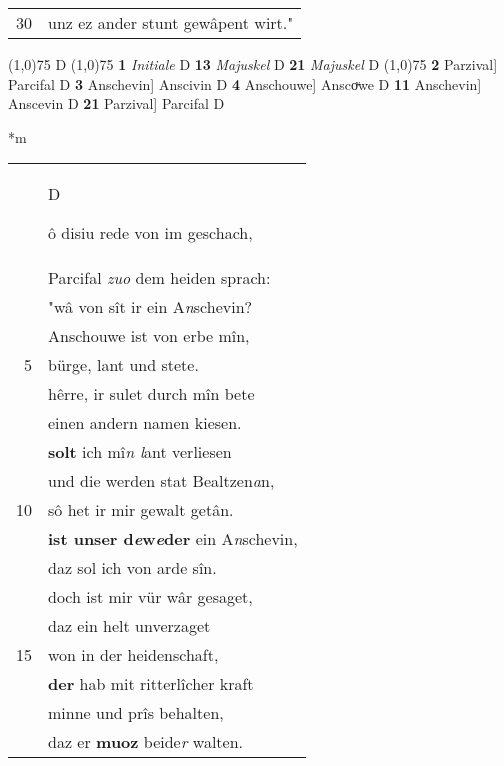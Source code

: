 \documentclass[8pt,a4paper,notitlepage]{article}
\begin{document}
\begin{table}[ht]
\begin{minipage}[t]{0.5\linewidth}
\begin{tabular}{rl}
30 & unz ez ander stunt gewâpent wirt."\\ 
\end{tabular}
\scriptsize
\line(1,0){75} \newline
D \newline
\line(1,0){75} \newline
\textbf{1} \textit{Initiale} D  \textbf{13} \textit{Majuskel} D  \textbf{21} \textit{Majuskel} D  \newline
\line(1,0){75} \newline
\textbf{2} Parzival] Parcifal D \textbf{3} Anschevin] Anscivin D \textbf{4} Anschouwe] Anscoͮwe D \textbf{11} Anschevin] Anscevin D \textbf{21} Parzival] Parcifal D \newline
\end{minipage}
\hspace{0.5cm}
\begin{minipage}[t]{0.5\linewidth}
\small
\begin{center}*m
\end{center}
\begin{tabular}{rl}
 & \begin{large}D\end{large}ô disiu rede von im geschach,\\ 
 & Parcifal \textit{zuo} dem heiden sprach:\\ 
 & "wâ von sît ir ein A\textit{n}schevin?\\ 
 & Anschouwe ist von erbe mîn,\\ 
5 & bürge, lant und stete.\\ 
 & hêrre, ir sulet durch mîn bete\\ 
 & einen andern namen kiesen.\\ 
 & \textbf{solt} ich mî\textit{n l}ant verliesen\\ 
 & und die werden stat Bealtzen\textit{a}n,\\ 
10 & sô het ir mir gewalt getân.\\ 
 & \textbf{ist unser d\textit{e}w\textit{e}der} ein A\textit{n}schevin,\\ 
 & daz sol ich von arde sîn.\\ 
 & doch ist mir vür wâr gesaget,\\ 
 & daz ein helt unverzaget\\ 
15 & won in der heidenschaft,\\ 
 & \textbf{der} hab mit ritterlîcher kraft\\ 
 & minne und prîs behalten,\\ 
 & daz er \textbf{muoz} beide\textit{r} walten.\\ 

\end{tabular}
\end{minipage}
\end{table}
\end{document}
